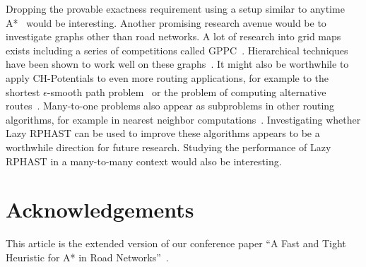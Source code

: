 \documentclass[manuscript,review]{acmart}
\begin{document}
Dropping the provable exactness requirement using a setup similar to anytime A*~\cite{DBLP:conf/aaai/ZhouH02,DBLP:conf/nips/LikhachevGT03} would be interesting.
Another promising research avenue would be to investigate graphs other than road networks.
A lot of research into grid maps exists including a series of competitions called GPPC~\cite{DBLP:conf/socs/SturtevantTTUKS15}.
Hierarchical techniques have been shown to work well on these graphs~\cite{DBLP:conf/aaai/UrasK14}.
It might also be worthwhile to apply CH-Potentials to even more routing applications, for example to the shortest $\epsilon$-smooth path problem~\cite{dss-tarrn-18} or the problem of computing alternative routes~\cite{adgw-arrn-13,bdgs-argrn-11,kobitzsch2015alternative}.
Many-to-one problems also appear as subproblems in other routing algorithms, for example in nearest neighbor computations~\cite{buchhold_et_al:LIPIcs.SEA.2021.18}.
Investigating whether Lazy RPHAST can be used to improve these algorithms appears to be a worthwhile direction for future research.
Studying the performance of Lazy RPHAST in a many-to-many context would also be interesting.

\section*{Acknowledgements}
This article is the extended version of our conference paper ``A Fast and Tight Heuristic for A* in Road Networks''~\cite{strasser_et_al:LIPIcs.SEA.2021.6}.








\end{document}
